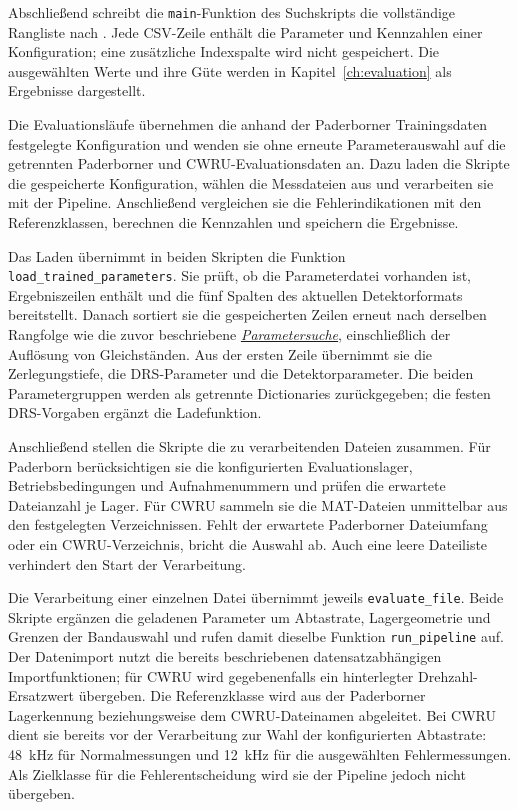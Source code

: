 Abschließend schreibt die \texttt{main}-Funktion des Suchskripts die
vollständige Rangliste nach
.
Jede CSV-Zeile enthält die Parameter und Kennzahlen einer Konfiguration;
eine zusätzliche Indexspalte wird nicht gespeichert. Die ausgewählten Werte
und ihre Güte werden in Kapitel~\ref{ch:evaluation} als Ergebnisse dargestellt.

\label{subsec:evaluationslaeufe_impl}

Die Evaluationsläufe übernehmen die anhand der Paderborner Trainingsdaten
festgelegte Konfiguration und wenden sie ohne erneute Parameterauswahl auf
die getrennten Paderborner und CWRU-Evaluationsdaten an. Dazu laden die Skripte
die gespeicherte Konfiguration, wählen die Messdateien aus und verarbeiten sie
mit der Pipeline. Anschließend vergleichen sie die Fehlerindikationen mit
den Referenzklassen, berechnen die Kennzahlen und speichern die Ergebnisse.

Das Laden übernimmt in beiden Skripten die Funktion
\texttt{load\_\allowbreak trained\_\allowbreak parameters}. Sie prüft, ob die
Parameterdatei vorhanden ist, Ergebniszeilen enthält und die fünf Spalten des
aktuellen Detektorformats bereitstellt. Danach sortiert sie die gespeicherten
Zeilen erneut nach derselben Rangfolge wie die zuvor beschriebene
\hyperref[subsec:parametersuche_impl]{\textit{Parametersuche}},
einschließlich der Auflösung von Gleichständen. Aus der
ersten Zeile übernimmt sie die Zerlegungstiefe, die DRS-Parameter und die
Detektorparameter. Die beiden Parametergruppen werden als getrennte
Dictionaries zurückgegeben; die festen DRS-Vorgaben ergänzt die Ladefunktion.

Anschließend stellen die Skripte die zu verarbeitenden Dateien zusammen.
Für Paderborn berücksichtigen sie die konfigurierten Evaluationslager,
Betriebsbedingungen und Aufnahmenummern und prüfen die erwartete Dateianzahl
je Lager. Für CWRU sammeln sie die MAT-Dateien unmittelbar aus den
festgelegten Verzeichnissen. Fehlt der erwartete Paderborner Dateiumfang oder
ein CWRU-Verzeichnis, bricht die Auswahl ab. Auch eine leere Dateiliste
verhindert den Start der Verarbeitung.

Die Verarbeitung einer einzelnen Datei übernimmt jeweils
\texttt{evaluate\_\allowbreak file}. Beide Skripte ergänzen die geladenen
Parameter um Abtastrate, Lagergeometrie und Grenzen der Bandauswahl und rufen
damit dieselbe Funktion \texttt{run\_pipeline} auf. Der Datenimport nutzt die
bereits beschriebenen datensatzabhängigen Importfunktionen; für CWRU wird
gegebenenfalls ein hinterlegter Drehzahl-Ersatzwert übergeben. Die Referenzklasse
wird aus der Paderborner Lagerkennung beziehungsweise dem CWRU-Dateinamen
abgeleitet. Bei CWRU dient sie bereits vor der Verarbeitung zur Wahl der
konfigurierten Abtastrate: 48~kHz für Normalmessungen und 12~kHz für die
ausgewählten Fehlermessungen. Als Zielklasse für die Fehlerentscheidung wird
sie der Pipeline jedoch nicht übergeben.

